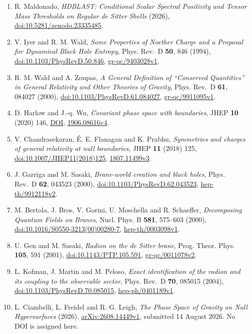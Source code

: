 \documentclass[
  11pt,
]{article}
\providecommand{\tightlist}{%
  \setlength{\itemsep}{0pt}\setlength{\parskip}{0pt}}
\begin{document}
\begin{enumerate}
\def\labelenumi{\arabic{enumi}.}
\tightlist
\item
  R. Maldonado, \emph{HDBLAST: Conditional Scalar Spectral Positivity
  and Tensor Mass Thresholds on Regular de Sitter Shells} (2026),
  \href{https://doi.org/10.5281/zenodo.23335485}{doi:10.5281/zenodo.23335485}.
\item
  V. Iyer and R. M. Wald, \emph{Some Properties of Noether Charge and a
  Proposal for Dynamical Black Hole Entropy}, Phys. Rev.~D \textbf{50},
  846 (1994),
  \href{https://doi.org/10.1103/PhysRevD.50.846}{doi:10.1103/PhysRevD.50.846},
  \href{https://arxiv.org/abs/gr-qc/9403028v1}{gr-qc/9403028v1}.
\item
  R. M. Wald and A. Zoupas, \emph{A General Definition of ``Conserved
  Quantities'' in General Relativity and Other Theories of Gravity},
  Phys. Rev.~D \textbf{61}, 084027 (2000),
  \href{https://doi.org/10.1103/PhysRevD.61.084027}{doi:10.1103/PhysRevD.61.084027},
  \href{https://arxiv.org/abs/gr-qc/9911095v1}{gr-qc/9911095v1}.
\item
  D. Harlow and J.-q. Wu, \emph{Covariant phase space with boundaries},
  JHEP \textbf{10} (2020) 146,
  \href{https://doi.org/10.1007/JHEP10(2020)146}{DOI},
  \href{https://arxiv.org/abs/1906.08616v4}{1906.08616v4}.
\item
  V. Chandrasekaran, É. E. Flanagan and K. Prabhu, \emph{Symmetries and
  charges of general relativity at null boundaries}, JHEP \textbf{11}
  (2018) 125,
  \href{https://doi.org/10.1007/JHEP11(2018)125}{doi:10.1007/JHEP11(2018)125},
  \href{https://arxiv.org/abs/1807.11499v3}{1807.11499v3}.
\item
  J. Garriga and M. Sasaki, \emph{Brane-world creation and black holes},
  Phys. Rev.~D \textbf{62}, 043523 (2000),
  \href{https://doi.org/10.1103/PhysRevD.62.043523}{doi:10.1103/PhysRevD.62.043523},
  \href{https://arxiv.org/abs/hep-th/9912118v2}{hep-th/9912118v2}.
\item
  M. Bertola, J. Bros, V. Gorini, U. Moschella and R. Schaeffer,
  \emph{Decomposing Quantum Fields on Branes}, Nucl. Phys. B
  \textbf{581}, 575--603 (2000),
  \href{https://doi.org/10.1016/S0550-3213(00)00280-7}{doi:10.1016/S0550-3213(00)00280-7},
  \href{https://arxiv.org/abs/hep-th/0003098v1}{hep-th/0003098v1}.
\item
  U. Gen and M. Sasaki, \emph{Radion on the de Sitter brane}, Prog.
  Theor. Phys. \textbf{105}, 591 (2001),
  \href{https://doi.org/10.1143/PTP.105.591}{doi:10.1143/PTP.105.591},
  \href{https://arxiv.org/abs/gr-qc/0011078v2}{gr-qc/0011078v2}.
\item
  L. Kofman, J. Martin and M. Peloso, \emph{Exact identification of the
  radion and its coupling to the observable sector}, Phys. Rev.~D
  \textbf{70}, 085015 (2004),
  \href{https://doi.org/10.1103/PhysRevD.70.085015}{doi:10.1103/PhysRevD.70.085015},
  \href{https://arxiv.org/abs/hep-ph/0401189v1}{hep-ph/0401189v1}.
\item
  L. Ciambelli, L. Freidel and R. G. Leigh, \emph{The Phase Space of
  Gravity on Null Hypersurfaces} (2026),
  \href{https://arxiv.org/abs/2608.14449v1}{arXiv:2608.14449v1},
  submitted 14 August 2026. No DOI is assigned here.
\end{enumerate}
\end{document}
